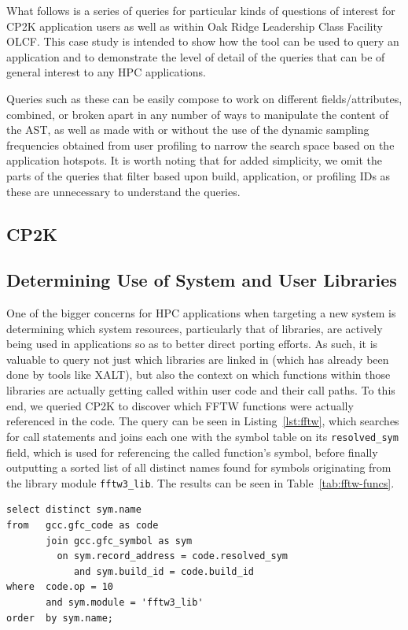 What follows is a series of queries for particular kinds of questions of interest for CP2K 
application users as well as within  Oak Ridge Leadership Class Facility \acs{OLCF}.
This case study is intended to show how the tool can be used to query an application and to 
demonstrate the level of detail of the queries that can  be of general interest to any \acs{HPC} 
applications.

Queries such as these can be easily compose to work on different fields/attributes, combined, or 
broken apart in any number of ways to manipulate the content of the AST, as well as made with or 
without the use of the dynamic sampling frequencies obtained from user profiling to narrow the 
search space based on the application hotspots.
It is worth noting that for added simplicity, we omit the parts of the queries that filter based upon 
build, application, or profiling IDs as these are unnecessary to understand the queries.

\subsection{CP2K}
\label{sec:cp2k}


\subsection{Determining Use of System and User Libraries}
One of the bigger concerns for \acs{HPC} applications when targeting a new system is determining which system resources, 
particularly that of libraries, are actively being used in applications so as to better direct porting 
efforts.
As such, it is valuable to query not just which libraries are linked in (which has already been done by  tools like XALT), but also the context on which functions within those libraries are actually getting called within user code and their call paths.
To this end, we queried CP2K to discover which \ac{FFTW} functions were actually referenced in the 
code.
The query can be seen in Listing~\ref{lst:fftw}, which searches for call statements and joins each one with the symbol table on its \texttt{resolved\_sym} field, which is 
used for referencing the called function's symbol, before finally outputting a sorted list of all distinct 
names found for symbols originating from the library module \texttt{fftw3\_lib}.
The results can be seen in Table~\ref{tab:fftw-funcs}.

\begin{lstlisting}[caption=Querying for Use of Library Functions, label=lst:fftw]
select distinct sym.name
from   gcc.gfc_code as code
       join gcc.gfc_symbol as sym
         on sym.record_address = code.resolved_sym
            and sym.build_id = code.build_id
where  code.op = 10
       and sym.module = 'fftw3_lib'
order  by sym.name;
\end{lstlisting}

